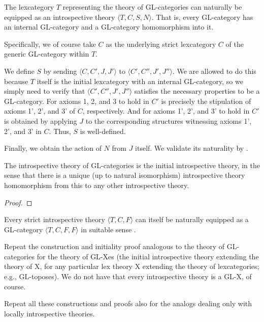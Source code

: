 \begin{construction}
The lexcategory $T$ representing the theory of GL-categories can naturally be equipped as an introspective theory $\langle T, C, S, N \rangle$. That is, every GL-category has an internal GL-category and a GL-category homomorphism into it.

Specifically, we of course take $C$ as the underlying strict lexcategory $C$ of the generic GL-category within $T$.

We define $S$ by sending $\langle C, C', J, J' \rangle$ to $\langle C', C'', J', J'' \rangle$. We are allowed to do this because $T$ itself is the initial lexcategory with an internal GL-category, so we simply need to verify that $\langle C', C'', J', J'' \rangle$ satisfies the necessary properties to be a GL-category. For axioms 1, 2, and 3 to hold in $C'$ is precisely the stipulation of axioms 1', 2', and 3' of $C$, respectively. And for axioms 1', 2', and 3' to hold in $C'$ is obtained by applying $J$ to the corresponding structures witnessing axioms 1', 2', and 3' in $C$. Thus, $S$ is well-defined.

Finally, we obtain the action of $N$ from $J$ itself. We validate its naturality by \TODO.

\end{construction}

\begin{theorem}
The introspective theory of GL-categories is the initial introspective theory, in the sense that there is a unique (up to natural isomorphism) introspective theory homomorphism from this to any other introspective theory.
\end{theorem}
\begin{proof}
\TODO
\end{proof}

\begin{construction}
Every strict introspective theory $\langle T, C, F \rangle$ can itself be naturally equipped as a GL-category $\langle T, C, F, F \rangle$ in suitable sense \TODO.
\end{construction}

\begin{TODOblock}
Repeat the construction and initiality proof analogous to the theory of GL-categories for the theory of GL-Xes (the initial introspective theory extending the theory of X, for any particular lex theory X extending the theory of lexcategories; e.g., GL-toposes). We do not have that every introspective theory is a GL-X, of course.

Repeat all these constructions and proofs also for the analogs dealing only with locally introspective theories.
\end{TODOblock}

